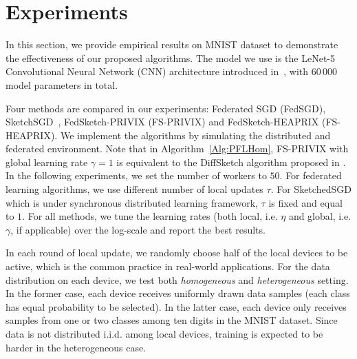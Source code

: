 \section{Experiments}

In this section, we provide empirical results on MNIST dataset to demonstrate the effectiveness of our proposed algorithms. The model we use is the LeNet-5 Convolutional Neural Network (CNN) architecture introduced in~\cite{lecun1998gradient}, with $60\,000$ model parameters in total.

Four methods are compared in our experiments: Federated SGD (FedSGD), SketchSGD~\cite{ivkin2019communication}, FedSketch-PRIVIX (FS-PRIVIX) and FedSketch-HEAPRIX (FS-HEAPRIX). We implement the algorithms by simulating the distributed and federated environment. 
Note that in Algorithm~\ref{Alg:PFLHom}, FS-PRIVIX with global learning rate $\gamma=1$ is equivalent to the DiffSketch algorithm proposed in \cite{li2018federated}. 
In the following experiments, we set the number of workers to $50$. 
For federated learning algorithms, we use different number of local updates $\tau$. 
For SketchedSGD which is under synchronous distributed learning framework, $\tau$ is fixed and equal to $1$. 
For all methods, we tune the learning rates (both local, i.e. $\eta$ and global, i.e. $\gamma$, if applicable) over the log-scale and report the best results.

In each round of local update, we randomly choose half of the local devices to be active, which is the common practice in real-world applications. 
For the data distribution on each device, we test both \emph{homogeneous} and \emph{heterogeneous} setting. 
In the former case, each device receives uniformly drawn data samples (each class has equal probability to be selected). 
In the latter case, each device only receives samples from one or two classes among ten digits in the MNIST dataset. 
Since data is not distributed i.i.d. among local devices, training is expected to be harder in the heterogeneous case.

